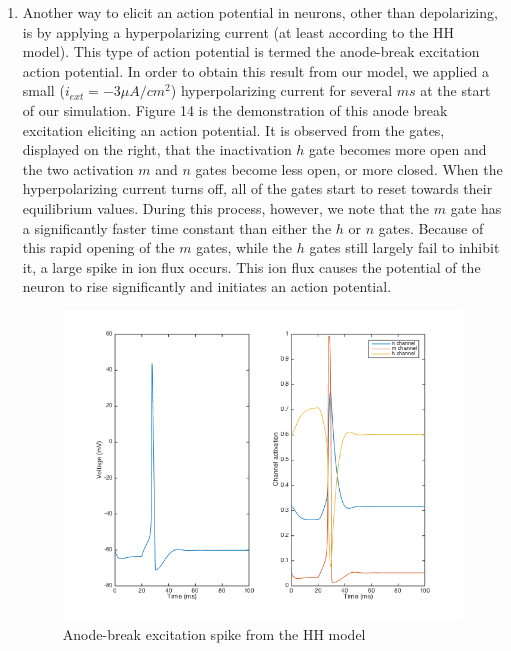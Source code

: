 \documentclass[10pt]{report}
\begin{document}
\begin{enumerate}
\item Another way to elicit an action potential in neurons, other than depolarizing, is by applying a hyperpolarizing current (at least according to the HH model). This type of action potential is termed the anode-break excitation action potential. In order to obtain this result from our model, we applied a small ($i_{ext} = -3 \mu A/cm^2$) hyperpolarizing current for several $ms$ at the start of our simulation. Figure 14 is the demonstration of this anode break excitation eliciting an action potential. It is observed from the gates, displayed on the right, that the inactivation $h$ gate becomes more open and the two activation $m$ and $n$ gates become less open, or more closed. When the hyperpolarizing current turns off, all of the gates start to reset towards their equilibrium values. During this process, however, we note that the $m$ gate has a significantly faster time constant than either the $h$ or $n$ gates. Because of this rapid opening of the $m$ gates, while the $h$ gates still largely fail to inhibit it, a large spike in ion flux occurs. This ion flux causes the potential of the neuron to rise significantly and initiates an action potential. \begin{figure}[h!] \includegraphics[scale=0.47]{motnq16.png} \caption[h14]{Anode-break excitation spike from the HH model} \end{figure}
%
%

\end{enumerate}
\end{document}
